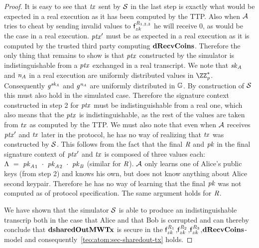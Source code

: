 \begin{proof}
    It is easy to see that $\mathit{tx}$ sent by $\mathcal{S}$ in the last step is exactly what would be expected in a real execution as it has been computed by the TTP.
    Also when $\mathcal{A}$ tries to cheat by sending invalid values to $\mathsf{f}^{\mathit{R}_{1,2,3}}_{zk}$ he will receive 0, as would be the case in a real execution.
    ${\mathit{ptx}}'$ must be as expected in a real execution as it is computed by the trusted third party computing $\mathbf{dRecvCoins}$.
    Therefore the only thing that remains to show is that $\mathit{ptx}$ constructed by the simulator is indistinguishable from a $\mathit{ptx}$ exchanged in a real transcript.
    We note that $\mathit{sk}_{\mathit{A}}$ and $\mathit{\mathit{n}_{\mathit{A}}}$ in a real execution are uniformly distributed values in $\cnstIntegersPrimeWithoutZero{\varPrime}$.
    Consequently $\mathit{g}^{\mathit{sk}_{\mathit{A}}}$ and $\mathit{g}^{\mathit{\mathit{n}_{\mathit{A}}}}$ are uniformly distributed in $\mathbb{G}$.
    By construction of $\mathcal{S}$ this must also hold in the simulated case.
    Therefore the signature context constructed in step 2 for $\mathit{ptx}$ must be indistinguishable from a real one, which also means that the $\mathit{ptx}$ is indistinguishable, as the rest of the values are taken from $\mathit{tx}$ as computed by the TTP.
    We must also note that even when $\mathcal{A}$ receives ${\mathit{ptx}}'$ and $\mathit{tx}$ later in the protocol, he has no way of realizing that $\mathit{tx}$ was constructed by $\mathcal{S}$.
    This follows from the fact that the final $\mathit{R}$ and $\mathit{pk}$ in the final signature context of ${\mathit{ptx}}'$ and $\mathit{tx}$ is composed of three values each:
    $\Lambda ~=~ {\mathit{pk}_{\mathit{A}}}_1 ~\cdot~ {\mathit{pk}_{\mathit{A}}}_2 ~\cdot~ {\mathit{pk}_{\mathit{B}}}$ (similar for $\mathit{R}$).
    $\mathcal{A}$ only learns one of Alice's public keys (from step 2) and knows his own, but does not know anything about Alice second keypair.
    Therefore he has no way of learning that the final $\mathit{pk}$ was not computed as of protocol specification.
    The same argument holds for $\mathit{R}$.

    We have shown that the simulator $\mathcal{S}$ is able to produce an indistinguishable transcrip both in the case that Alice and that Bob is corrupted and can thereby conclude that $\mathbf{dsharedOutMWTx}$ is secure in the $\mathsf{f}^{\mathit{R}_1}_{zk}$,$\mathsf{f}^{\mathit{R}_2}_{zk}$,$\mathsf{f}^{\mathit{R}_3}_{zk}$,$\mathbf{dRecvCoins}$-model and consequently~\cref{teo:atom:sec-sharedout-tx} holds.
\end{proof}

